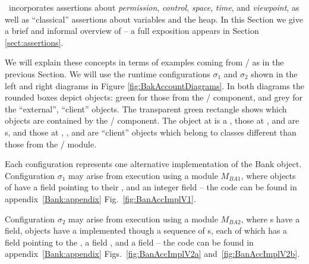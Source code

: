 

%
%
\Chainmail\ incorporates assertions   about
%
\textit{permission},
%
\textit{control},
%
%
\textit{space}, %
%
\textit{time},
%
and \textit{viewpoint},
%
as well as   ``classical'' assertions 
about  variables and the heap.
%
In this Section we  give a brief and informal  overview of %
\Chainmail -- a full exposition appears in Section \ref{sect:assertions}.



 We  will explain these concepts in terms of examples coming from  / as  in the previous Section.
We will use the runtime configurations $\sigma_1$ and $\sigma_2$ 
shown in the left and right diagrams in Figure \ref{fig:BakAccountDiagrams}.
In both diagrams the rounded boxes depict objects:  green for those from the 
/ component, and grey for the ``external'',  ``client'' objects.
The transparent green rectangle  shows which objects are contained by the / component.
The object at  is a , those at ,  and  are 
s, and those at , ,  and  are 
``client'' objects which belong to classes different than those from the /  module.

Each configuration represents one alternative implementation of the Bank object.
Configuration  $\sigma_1$ may arise from execution using a module $M_{BA1}$, where   objects of
  have a field  pointing to their , and an integer field  
-- the code can be found in appendix~\ref{Bank:appendix} Fig.~\ref{fig:BanAccImplV1}.

Configuration  $\sigma_2$ may arise from execution using a module $M_{BA2}$,  where s have a 
field,   objects  have a  implemented though a sequence of s, each of which has a 
 field pointing to the , a field , and a
 field  -- the code can be found in appendix~\ref{Bank:appendix}
Figs.~\ref{fig:BanAccImplV2a} and~\ref{fig:BanAccImplV2b}.

